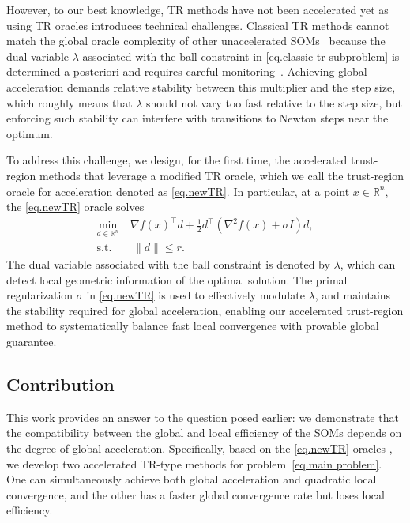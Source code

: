 \documentclass{article}
\numberwithin{equation}{section}
\numberwithin{equation}{section}
\begin{document}
However, to our best knowledge,  TR methods have not been accelerated yet as
using TR oracles introduces technical challenges. Classical TR methods cannot match the global oracle complexity of other unaccelerated SOMs~\cite{cartis2010on,curtis2017trust} because the dual variable $\lambda$ associated with the ball constraint in \eqref{eq.classic tr subproblem} is determined a posteriori and requires careful monitoring~\cite{curtis2018concise}. Achieving global acceleration demands relative stability between this multiplier and the step size, which roughly means that $\lambda$ should not vary too fast relative to the step size, but enforcing such stability can interfere with transitions to Newton steps near the optimum.

To address this challenge, we design, for the first time, the accelerated trust-region methods that leverage a modified TR oracle, which we call the trust-region oracle for acceleration denoted as \ref{eq.newTR}. In particular, at a point $x \in \mathbb{R}^n$, the \ref{eq.newTR} oracle solves
\begin{equation*}
    \begin{aligned}
        \min_{d \in \mathbb{R}^n}~ & \nabla f(x)^\top d
        + \tfrac{1}{2} d^\top (\nabla^2 f(x) + \sigma I) d, \\
        \text{s.t.}                & ~ \|d\| \le r.
    \end{aligned}
    \tag*{(TR$_+$)}
\end{equation*}
The dual variable associated with the ball constraint is denoted by $\lambda$, which can detect local geometric information of the optimal solution.
The primal regularization $\sigma$ in \ref{eq.newTR} is used to effectively modulate $\lambda$, and maintains the stability required for global acceleration, enabling our accelerated trust-region method to systematically balance fast local convergence with provable global guarantee.
\subsection{Contribution}
This work provides an answer to the question posed earlier: we demonstrate that the compatibility between the global and local efficiency of the SOMs depends on the degree of global acceleration.
Specifically, based on the \ref{eq.newTR} oracles \cite{jiang2026beyond}, we develop two accelerated TR-type methods for problem~\eqref{eq.main problem}. One can simultaneously achieve both global acceleration and quadratic local convergence, and the other has a faster global convergence rate but loses local efficiency.
\end{document}
